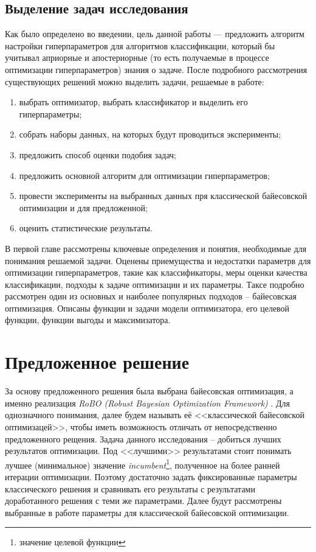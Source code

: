 \documentclass[times,specification,annotation]{itmo-student-thesis}
\begin{document}
	\section{Выделение задач исследования}
	Как было определено во введении, цель данной работы --- предложить алгоритм настройки гиперпараметров для алгоритмов классификации, который бы учитывал априорные и апостериорные (то есть получаемые в процессе оптимизации гиперпараметров) знания о задаче. После подробного рассмотрения существующих решений можно выделить задачи, решаемые в работе:
	\begin{enumerate}
		\item выбрать оптимизатор, выбрать классификатор и выделить его гиперпараметры;
		\item собрать наборы данных, на которых будут проводиться эксперименты;
		\item предложить способ оценки подобия задач;
		\item предложить основной алгоритм для оптимизации гиперпараметров;
		\item провести эксперименты на выбранных данных пря классической байесовской оптимизации и для предложенной;
		\item оценить статистические результаты.
	\end{enumerate}
	 
	\chapterconclusion
	В первой главе рассмотрены ключевые определения и понятия, необходимые для понимания решаемой задачи. Оценены приемущества и недостатки параметрв для оптимизации гиперпараметров, такие как классификаторы, меры оценки качества классификации, подходы к задаче оптимизации и их параметры. Таксе подробно рассмотрен один из основных и наиболее популярных подходов -- байесовская оптимизация. Описаны функции и задачи модели оптимизатора, его целевой функции, функции выгоды и максимизатора.
	
	\chapter{Предложенное решение}
	За основу предложенного решения была выбрана байесовская оптимизация, а именно реализация \textit{RoBO (Robust Bayesian Optimization Framework)} \cite{klein-bayesopt17}. Для однозначного понимания, далее будем называть её <<классической байесовской оптимизацей>>, чтобы иметь возможность отличать от непосредственно предложенного рещения. Задача данного исследования -- добиться лучших результатов оптимизации. Под <<лучшими>> результатами стоит понимать лучшее (минимальное) значение \textit{incumbent}\footnote{значение целевой функции}, полученное на более ранней итерации оптимизации. Поэтому достаточно задать фиксированные параметры классического решения и сравнивать его результаты с результатами доработанного решения с теми же параметрами. Далее будут рассмотрены выбранные в работе параметры для классической байесовской оптимизации.
	
\end{document}
